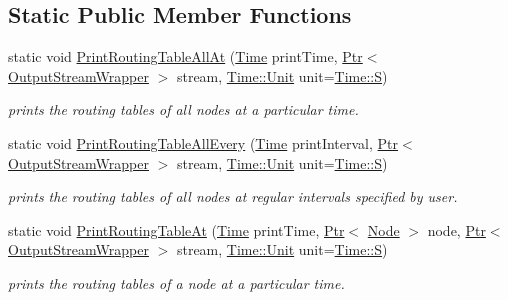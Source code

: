 \subsection*{Static Public Member Functions}
\begin{DoxyCompactItemize}
\item 
static void \hyperlink{classns3_1_1Ipv4RoutingHelper_a10d8ba23eca330de968fdfbca2730ec3}{Print\+Routing\+Table\+All\+At} (\hyperlink{classns3_1_1Time}{Time} print\+Time, \hyperlink{classns3_1_1Ptr}{Ptr}$<$ \hyperlink{classns3_1_1OutputStreamWrapper}{Output\+Stream\+Wrapper} $>$ stream, \hyperlink{classns3_1_1Time_a87a7f4d29c68b047a72d291ad660295a}{Time\+::\+Unit} unit=\hyperlink{classns3_1_1Time_a87a7f4d29c68b047a72d291ad660295aade8622b06524a328cd3a59db6ccf76af}{Time\+::S})
\begin{DoxyCompactList}\small\item\em prints the routing tables of all nodes at a particular time. \end{DoxyCompactList}\item 
static void \hyperlink{classns3_1_1Ipv4RoutingHelper_ae82209b94194b58afed38b80e92ed202}{Print\+Routing\+Table\+All\+Every} (\hyperlink{classns3_1_1Time}{Time} print\+Interval, \hyperlink{classns3_1_1Ptr}{Ptr}$<$ \hyperlink{classns3_1_1OutputStreamWrapper}{Output\+Stream\+Wrapper} $>$ stream, \hyperlink{classns3_1_1Time_a87a7f4d29c68b047a72d291ad660295a}{Time\+::\+Unit} unit=\hyperlink{classns3_1_1Time_a87a7f4d29c68b047a72d291ad660295aade8622b06524a328cd3a59db6ccf76af}{Time\+::S})
\begin{DoxyCompactList}\small\item\em prints the routing tables of all nodes at regular intervals specified by user. \end{DoxyCompactList}\item 
static void \hyperlink{classns3_1_1Ipv4RoutingHelper_a0abbae008296b5ab6f4e7612390ee37f}{Print\+Routing\+Table\+At} (\hyperlink{classns3_1_1Time}{Time} print\+Time, \hyperlink{classns3_1_1Ptr}{Ptr}$<$ \hyperlink{classns3_1_1Node}{Node} $>$ node, \hyperlink{classns3_1_1Ptr}{Ptr}$<$ \hyperlink{classns3_1_1OutputStreamWrapper}{Output\+Stream\+Wrapper} $>$ stream, \hyperlink{classns3_1_1Time_a87a7f4d29c68b047a72d291ad660295a}{Time\+::\+Unit} unit=\hyperlink{classns3_1_1Time_a87a7f4d29c68b047a72d291ad660295aade8622b06524a328cd3a59db6ccf76af}{Time\+::S})
\begin{DoxyCompactList}\small\item\em prints the routing tables of a node at a particular time. \end{DoxyCompactList}\item 

\end{DoxyCompactItemize}
